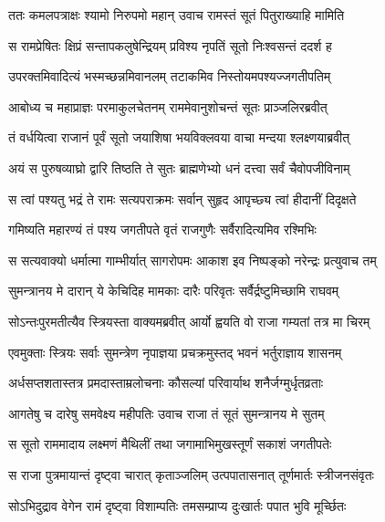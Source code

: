 
\twolineshloka
{ततः कमलपत्राक्षः श्यामो निरुपमो महान्}
{उवाच रामस्तं सूतं पितुराख्याहि मामिति} %

\twolineshloka
{स रामप्रेषितः क्षिप्रं सन्तापकलुषेन्द्रियम्}
{प्रविश्य नृपतिं सूतो निःश्वसन्तं ददर्श ह} %

\twolineshloka
{उपरक्तमिवादित्यं भस्मच्छन्नमिवानलम्}
{तटाकमिव निस्तोयमपश्यज्जगतीपतिम्} %

\twolineshloka
{आबोध्य च महाप्राज्ञः परमाकुलचेतनम्}
{राममेवानुशोचन्तं सूतः प्राञ्जलिरब्रवीत्} %

\twolineshloka
{तं वर्धयित्वा राजानं पूर्वं सूतो जयाशिषा}
{भयविक्लवया वाचा मन्दया श्लक्ष्णयाब्रवीत्} %

\twolineshloka
{अयं स पुरुषव्याघ्रो द्वारि तिष्ठति ते सुतः}
{ब्राह्मणेभ्यो धनं दत्त्वा सर्वं चैवोपजीविनाम्} %

\twolineshloka
{स त्वां पश्यतु भद्रं ते रामः सत्यपराक्रमः}
{सर्वान् सुहृद आपृच्छ्य त्वां हीदानीं दिदृक्षते} %

\twolineshloka
{गमिष्यति महारण्यं तं पश्य जगतीपते}
{वृतं राजगुणैः सर्वैरादित्यमिव रश्मिभिः} %

\twolineshloka
{स सत्यवाक्यो धर्मात्मा गाम्भीर्यात् सागरोपमः}
{आकाश इव निष्पङ्को नरेन्द्रः प्रत्युवाच तम्} %

\twolineshloka
{सुमन्त्रानय मे दारान् ये केचिदिह मामकाः}
{दारैः परिवृतः सर्वैर्द्रष्टुमिच्छामि राघवम्} %

\twolineshloka
{सोऽन्तःपुरमतीत्यैव स्त्रियस्ता वाक्यमब्रवीत्}
{आर्यो ह्वयति वो राजा गम्यतां तत्र मा चिरम्} %

\twolineshloka
{एवमुक्ताः स्त्रियः सर्वाः सुमन्त्रेण नृपाज्ञया}
{प्रचक्रमुस्तद् भवनं भर्तुराज्ञाय शासनम्} %

\twolineshloka
{अर्धसप्तशतास्तत्र प्रमदास्ताम्रलोचनाः}
{कौसल्यां परिवार्याथ शनैर्जग्मुर्धृतव्रताः} %

\twolineshloka
{आगतेषु च दारेषु समवेक्ष्य महीपतिः}
{उवाच राजा तं सूतं सुमन्त्रानय मे सुतम्} %

\twolineshloka
{स सूतो राममादाय लक्ष्मणं मैथिलीं तथा}
{जगामाभिमुखस्तूर्णं सकाशं जगतीपतेः} %

\twolineshloka
{स राजा पुत्रमायान्तं दृष्ट्वा चारात् कृताञ्जलिम्}
{उत्पपातासनात् तूर्णमार्तः स्त्रीजनसंवृतः} %

\twolineshloka
{सोऽभिदुद्राव वेगेन रामं दृष्ट्वा विशाम्पतिः}
{तमसम्प्राप्य दुःखार्तः पपात भुवि मूर्च्छितः} %

